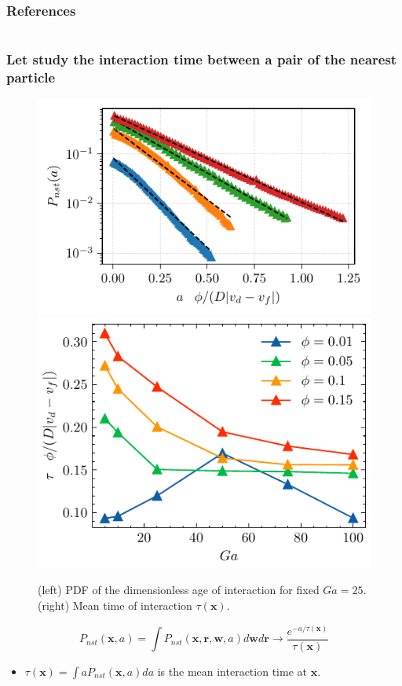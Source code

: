 \documentclass{sintefbeamer}
\begin{document}
\begin{frame}
\end{frame}

\begin{frame}[t]
  \frametitle{References}
  
\end{frame}

 
\backmatter


\section*{}

\begin{frame}
  \frametitle{Let study the interaction time between  a pair of the nearest particle}
    \begin{figure}
        \includegraphics[height=0.23\textwidth]{image/HOMOGENEOUS/fDrop/P_a_Ga_25.pdf}
        \includegraphics[height=0.23\textwidth]{image/HOMOGENEOUS/fPA/ageGa.pdf}
        \caption{ (left) PDF of the dimensionless age of interaction for fixed $Ga = 25$.
      (right) Mean time of interaction $\tau(\textbf{x})$.}
    \end{figure}
  \begin{equation*}
    P_{nst}(\textbf{x},a) 
    = \int P_{nst}(\textbf{x},\textbf{r},\textbf{w},a) d\textbf{w}d\textbf{r}
    \rightarrow\frac{e^{-a/\tau(\textbf{x})}}{\tau(\textbf{x})}
  \end{equation*}
\begin{itemize}
  \item $\tau(\textbf{x}) = \int a P_{nst}(\textbf{x},a) da$ is the mean interaction time at $\textbf{x}$. 
\end{itemize}
\end{frame}
\end{document}
